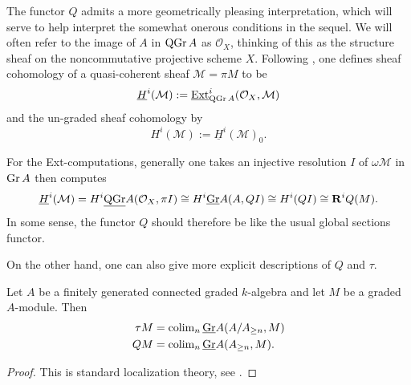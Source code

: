 The functor \(Q\) admits a more geometrically pleasing interpretation, which will serve to help interpret the somewhat onerous conditions in the sequel.
We will often refer to the image of \(A\) in \(\operatorname{QGr}A\) as \(\mathcal{O}_X\), thinking of this as the structure sheaf on the noncommutative projective scheme \(X\).
Following \textcite{AZ94}, one defines sheaf cohomology of a quasi-coherent sheaf \(\mathcal{M} = \pi{M}\) to be
\[\underline{H}^i(\mathcal{M}) := \operatorname{\underline{Ext}}^i_{\operatorname{QGr}A}(\mathcal{O}_X, \mathcal{M})\]
and the un-graded sheaf cohomology by
\[H^i(\mathcal{M}) := \underline{H}^i(\mathcal{M})_0.\]

For the Ext-computations, generally one takes an injective resolution \(I\) of \(\omega\mathcal{M}\) in \(\operatorname{Gr}A\) then computes
\[\underline{H}^i(\mathcal{M}) = H^i\underline{\operatorname{QGr}}A(\mathcal{O}_X, \pi{I}) \cong H^i\underline{\operatorname{Gr}}A(A, QI) \cong H^i(QI) \cong \mathbf{R}^iQ(M).\]
In some sense, the functor \(Q\) should therefore be like the usual global sections functor.

On the other hand, one can also give more explicit descriptions of \(Q\) and \(\tau\). 

\begin{proposition}\label{prop: explicit Q and tau}
  Let \(A\) be a finitely generated connected graded \(k\)-algebra and let \(M\) be a graded \(A\)-module. Then 
  \begin{align*}
    \tau M & = \operatorname{colim}_n \underline{\operatorname{Gr}}A(A/A_{\geq n}, M) \\
    Q M & = \operatorname{colim}_n \underline{\operatorname{Gr}}A(A_{\geq n}, M).
  \end{align*}
\end{proposition}

\begin{proof}
  This is standard localization theory, see \textcite{Stenstrom75}.
\end{proof}
